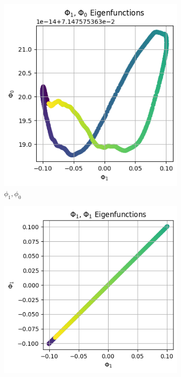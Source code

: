 \begin{figure}[H]
    \centering
    \begin{subfigure}{.25\textwidth}
        \includegraphics[width=\linewidth]{images/ex3_task2_part3_2D_1.png}
        \caption{$\phi_1, \phi_0$}
    \end{subfigure}%
    \begin{subfigure}{.25\textwidth}
        \includegraphics[width=\linewidth]{images/ex3_task2_part3_2D_2.png}

\end{subfigure}
\end{figure}
